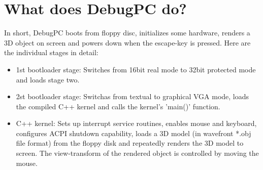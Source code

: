 \documentclass{article}
\begin{document}
\section{What does DebugPC do?}
In short, DebugPC boots from floppy disc, initializes some hardware, renders a 3D object on screen and powers down when the escape-key is pressed.
Here are the individual stages in detail:
\begin{itemize}
\item 1st bootloader stage: Switches from 16bit real mode to 32bit protected mode and loads stage two.
\item 2st bootloader stage: Switchas from textual to graphical VGA mode, loads the compiled C++ kernel and calls the kernel's 'main()' function.
\item C++ kernel: Sets up interrupt service routines, enables mouse and keyboard, configures ACPI shutdown capability, loads a 3D model (in wavefront *.obj file format) from the floppy disk and repeatedly renders the 3D model to screen. The view-transform of the rendered object is controlled by moving the mouse.
\end{itemize}
\end{document}
